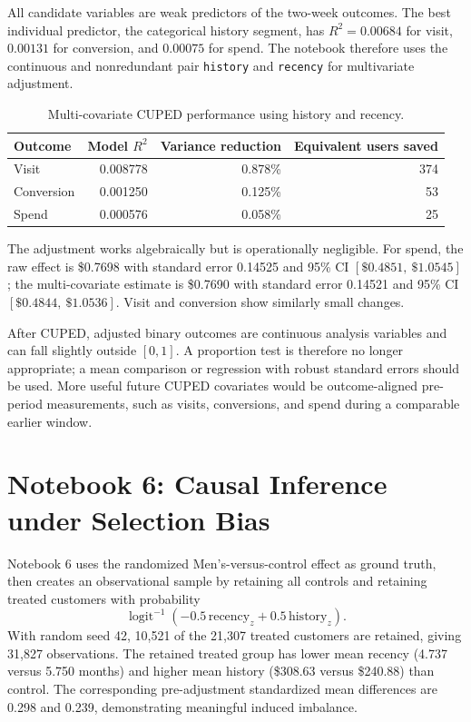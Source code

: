 \documentclass[11pt]{article}
\begin{document}
All candidate variables are weak predictors of the two-week outcomes. The best individual predictor, the categorical history segment, has $R^2=0.00684$ for visit, $0.00131$ for conversion, and $0.00075$ for spend. The notebook therefore uses the continuous and nonredundant pair \texttt{history} and \texttt{recency} for multivariate adjustment.

\begin{table}[H]
\centering
\caption{Multi-covariate CUPED performance using history and recency.}
\label{tab:cuped}
\begin{tabular}{lrrr}
\toprule
Outcome & Model $R^2$ & Variance reduction & Equivalent users saved \\
\midrule
Visit & 0.008778 & 0.878\% & 374 \\
Conversion & 0.001250 & 0.125\% & 53 \\
Spend & 0.000576 & 0.058\% & 25 \\
\bottomrule
\end{tabular}
\end{table}

The adjustment works algebraically but is operationally negligible. For spend, the raw effect is \$0.7698 with standard error 0.14525 and 95\% CI $[\$0.4851,\ \$1.0545]$; the multi-covariate estimate is \$0.7690 with standard error 0.14521 and 95\% CI $[\$0.4844,\ \$1.0536]$. Visit and conversion show similarly small changes.

After CUPED, adjusted binary outcomes are continuous analysis variables and can fall slightly outside $[0,1]$. A proportion test is therefore no longer appropriate; a mean comparison or regression with robust standard errors should be used. More useful future CUPED covariates would be outcome-aligned pre-period measurements, such as visits, conversions, and spend during a comparable earlier window.

\section{Notebook 6: Causal Inference under Selection Bias}

Notebook 6 uses the randomized Men's-versus-control effect as ground truth, then creates an observational sample by retaining all controls and retaining treated customers with probability
\begin{equation}
    \operatorname{logit}^{-1}\!\left(-0.5\,\text{recency}_{z}
    +0.5\,\text{history}_{z}\right).
\end{equation}
With random seed 42, 10,521 of the 21,307 treated customers are retained, giving 31,827 observations. The retained treated group has lower mean recency (4.737 versus 5.750 months) and higher mean history (\$308.63 versus \$240.88) than control. The corresponding pre-adjustment standardized mean differences are 0.298 and 0.239, demonstrating meaningful induced imbalance.
\end{document}
